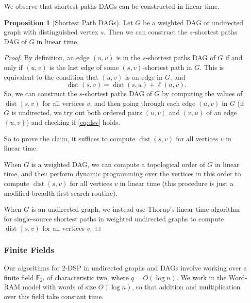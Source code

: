 \documentclass[11pt]{article}
\newcommand{\set}[1]{\left\{#1\right\}}
\DeclareMathOperator{\dist}{dist}
\theoremstyle{definition}
\newtheorem{proposition}[theorem]{Proposition}
\begin{document}
We observe that shortest paths DAGs can be constructed in linear time.

\begin{proposition}[Shortest Path DAGs]
    \label{prop:sp-DAG}
    Let $G$ be a weighted DAG or undirected graph with distinguished vertex $s$.
    Then we can construct the $s$-shortest paths DAG of $G$ in linear time.
\end{proposition}
\begin{proof}
    By definition, an edge $(u,v)$ is in the $s$-shortest paths DAG of $G$ if and only if $(u,v)$ is the last edge of some  $(s,v)$-shortest path in $G$.
    This is equivalent to the condition that $(u,v)$ is an edge in $G$, and 
        \begin{equation}
        \label{eq:dsv}
        \dist(s,v) = \dist(s,u) + \ell(u,v).
        \end{equation}
    So, we can construct the $s$-shortest paths DAG of $G$ by computing the values of $\dist(s,v)$ for all vertices $v$, and then going through each edge $(u,v)$ in $G$ (if $G$ is undirected, we try out both ordered pairs $(u,v)$ and $(v,u)$ of an edge $\set{u,v}$) and checking if \cref{eq:dsv} holds.

    So to prove the claim, it suffices to compute $\dist(s,v)$ for all vertices $v$ in linear time.

    When $G$ is a weighted DAG, we can compute a topological order of $G$ in linear time, and then perform dynamic programming over the vertices in this order to compute $\dist(s,v)$ for all vertices $v$ in linear time (this procedure is just a modified breadth-first search routine).

    When $G$ is an undirected graph, we instead use Thorup's linear-time algorithm for single-source shortest paths in weighted undirected graphs \cite{Thorup1997} to compute $\dist(s,v)$ for all vertices $v$.
\end{proof}




\subsubsection*{Finite Fields}

Our algorithms for \textsf{2-DSP} in undirected graphs and DAGs involve working over a finite field $\mathbb{F}_{2^q}$ of characteristic two, where $q = O(\log n)$.
We work in the Word-RAM model with words of size $O(\log n)$, so that 
addition and multiplication over this field take constant time.
\end{document}
